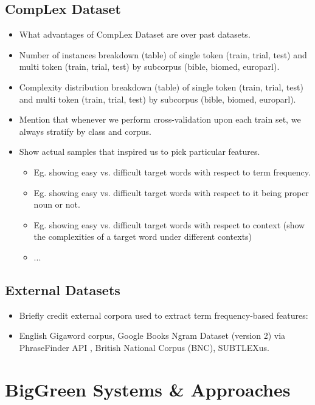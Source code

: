 \documentclass[11pt,a4paper]{article}
\begin{document}
\subsection{CompLex Dataset}

\begin{itemize}
  \item What advantages of CompLex Dataset are over past datasets.
  \item Number of instances breakdown (table) of single token (train, trial, test) and multi token (train, trial, test) by subcorpus (bible, biomed, europarl).
  \item Complexity distribution breakdown (table) of single token (train, trial, test) and multi token (train, trial, test) by subcorpus (bible, biomed, europarl).
  \item Mention that whenever we perform cross-validation upon each train set, we always stratify by class and corpus.
  \item Show actual samples that inspired us to pick particular features. 
  \begin{itemize}
    \item Eg. showing easy vs. difficult target words with respect to term frequency.
    \item Eg. showing easy vs. difficult target words with respect to it being proper noun or not.
    \item Eg. showing easy vs. difficult target words with respect to context (show the complexities of a target word under different contexts)
    \item ...
  \end{itemize}
\end{itemize}

\subsection{External Datasets}

\begin{itemize}
  \item Briefly credit external corpora used to extract term frequency-based features:
  \item English Gigaword corpus, Google Books Ngram Dataset (version 2) via PhraseFinder API \citep{phrasefinder}, British National Corpus (BNC), SUBTLEXus.
\end{itemize}

\section{BigGreen Systems \& Approaches}
\end{document}

